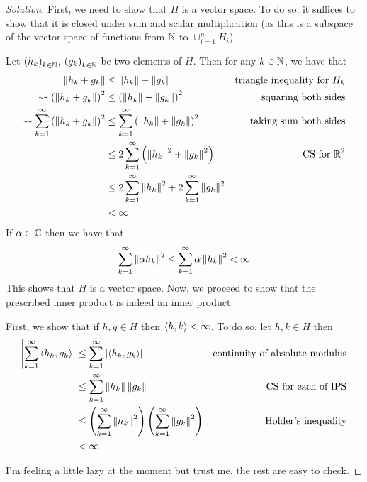 \begin{proof}[Solution]
    First, we need to show that $H$ is a vector space. To do so, it suffices to show that it is closed under sum and scalar multiplication (as this is a subspace of the vector space of functions from $\mathbb N$ to $\cup_{i=1}^{n} H_{i}$). 

Let $\left( h_{k} \right)_{k \in \mathbb N}$, $\left( g_{k} \right)_{k\in \mathbb N}$ be two elements of $H$. Then for any $k\in \mathbb N$, we have that
\begin{align*}
    \left\lVert h_{k} + g_{k} \right\rVert &\le \left\lVert h_{k} \right\rVert + \left\lVert g_{k} \right\rVert & \text{triangle inequality for $H_{k}$} \\
    \leadsto \left( \left\lVert h_{k} + g_{k} \right\rVert \right) ^{2} &\le  \left( \left\lVert h_{k} \right\rVert + \left\lVert g_{k} \right\rVert  \right)^{2} & \text{squaring both sides} \\
    \leadsto \sum_{k=1}^{\infty} \left( \left\lVert h_{k} + g_{k} \right\rVert \right) ^{2} &\le \sum_{k=1}^{\infty} \left( \left\lVert h_{k} \right\rVert + \left\lVert g_{k} \right\rVert  \right)^{2} & \text{taking sum both sides} \\
    & \le 2 \sum_{k=1}^{\infty} \left( \left\lVert h_{k} \right\rVert^{2} + \left\lVert g_{k} \right\rVert^{2} \right) & \text{CS for $\mathbb R^{2}$} \\
   & \le 2 \sum_{k=1}^{\infty}  \left\lVert h_{k} \right\rVert^{2} + 2 \sum_{k=1}^{\infty} \left\lVert g_{k} \right\rVert^{2}  \\
   & < \infty
\end{align*}
If $\alpha \in \mathbb C$ then we have that 
\begin{align*}
    \sum_{k=1}^{\infty} \left\lVert \alpha h_{k} \right\rVert^{2} \le \sum_{k=1}^{\infty} \alpha \left\lVert h_{k} \right\rVert^{2} < \infty
\end{align*}
This shows that $H$ is a vector space. Now, we proceed to show that the prescribed inner product is indeed an inner product.

First, we show that if $h, g \in H$ then $\left\langle h,k \right\rangle < \infty$. To do so, let $h,k \in H$ then
\begin{align*}
    \left\lvert \sum_{k=1}^{\infty} \left\langle h_{k}, g_{k} \right\rangle \right\rvert &\le \sum_{k=1}^{\infty} \left\lvert \left\langle h_{k},g_{k} \right\rangle \right\rvert & \text{continuity of absolute modulus} \\
    &\le \sum_{k=1}^{\infty} \left\lVert h_{k} \right\rVert\left\lVert g_{k} \right\rVert &\text{CS for each of IPS}  \\
    &\le \left( \sum_{k=1}^{\infty} \left\lVert h_{k} \right\rVert^{2} \right) \left( \sum_{k=1}^{\infty} \left\lVert g_{k} \right\rVert^{2} \right) & \text{Holder's inequality} \\
&< \infty
\end{align*}

I'm feeling a little lazy at the moment but trust me, the rest are easy to check. \checkmark

\end{proof}
